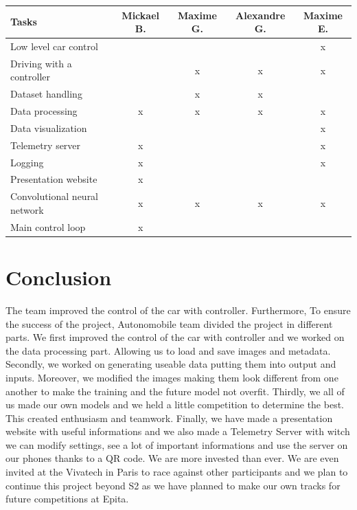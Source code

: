 \documentclass[12pt]{article}
\begin{document}
\begin{tabular}{|l|c|c|c|c|} 
\hline
Tasks                        & Mickael B. & Maxime G. & Alexandre G. & Maxime E.  \\ 
\hline
Low level car control        &            &           &              & x          \\ 
\hline
Driving with a controller    &            & x         & x            & x          \\ 
\hline
Dataset handling             &            & x         & x            &            \\ 
\hline
Data processing              & x          & x         & x            & x          \\ 
\hline
Data visualization           &            &           &              & x          \\ 
\hline
Telemetry server             & x          &           &              & x          \\ 
\hline
Logging                      & x          &           &              & x          \\ 
\hline
Presentation website         & x          &           &              &            \\ 
\hline
Convolutional neural network & x          & x         & x            & x          \\ 
\hline
Main control loop            & x          &           &              &            \\
\hline
\end{tabular}

\section {Conclusion}
The team improved the control of the car with controller. Furthermore, 
To ensure the success of the project, Autonomobile team divided the project in different parts. We first improved the control of the car with controller and we worked on the data processing part. Allowing us to load and save images and metadata. Secondly, we worked on generating useable data putting them into output and inputs. Moreover, we modified the images making them look different from one another to make the training and the future model not overfit. Thirdly, we all of us made our own models and we held a little competition to determine the best. This created enthusiasm and teamwork. Finally, we have made a presentation website with useful informations and we also made a Telemetry Server with witch we can modify settings, see a lot of important informations and use the server on our phones thanks to a QR code. We are more invested than ever. We are even invited at the Vivatech in Paris to race against other participants and we plan to continue this project beyond S2 as we have planned to make our own tracks for future competitions at Epita.
\end{document}

